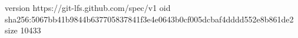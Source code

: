 version https://git-lfs.github.com/spec/v1
oid sha256:5067bb41b9844b637705837841f3e4e0643b0cf005dcbaf4dddd552e8b861de2
size 10433
